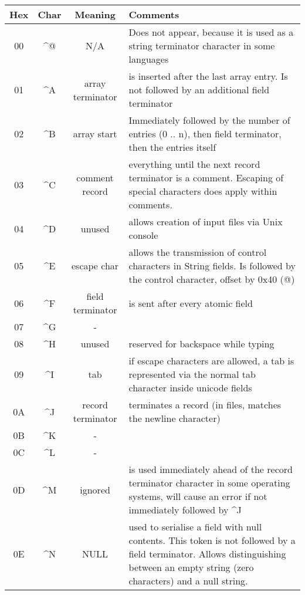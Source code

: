 \documentclass[11pt,a4paper,oneside]{article}
\begin{document}
\begin{tabular}{|c|c|c|p{8cm}|}
\hline
Hex & Char & Meaning & Comments \\
\hline
00 & \textasciicircum {@} & N/A & Does not appear, because it is used as a
string terminator character in some languages \\
01 & \textasciicircum A & array terminator  & is inserted after the last array
entry. Is not followed by an additional field terminator \\
02 & \textasciicircum B & array start       & Immediately followed by the number
of entries (0 .. n), then field terminator, then the entries itself \\
03 & \textasciicircum C & comment record    & everything until the next
record terminator is a comment. Escaping of special characters does apply within
comments.
\\
04 & \textasciicircum D & unused            & allows creation of input files
via Unix console \\
05 & \textasciicircum E & escape char       & allows the transmission of control
characters in String fields. Is followed by the control character, offset by 0x40 ({@}) \\
06 & \textasciicircum F & field terminator  & is sent after every atomic field
\\
07 & \textasciicircum G &       -            & \\
08 & \textasciicircum H & unused             & reserved for backspace while
typing \\
09 & \textasciicircum I &       tab          & if escape characters are
allowed, a tab is represented via the normal tab character inside unicode
fields \\
0A & \textasciicircum J & record terminator & terminates a record (in files,
matches the newline character) \\
0B & \textasciicircum K &       -            & \\
0C & \textasciicircum L &       -            & \\
0D & \textasciicircum M & ignored           & is used immediately ahead of the record
terminator character in some operating systems, will cause an error if not
immediately followed by \textasciicircum J \\
0E & \textasciicircum N & NULL & used to serialise a field with null contents.
This token is not followed by a field terminator. Allows distinguishing between
an empty string (zero characters) and a null string.\\

\end{tabular}
\end{document}
